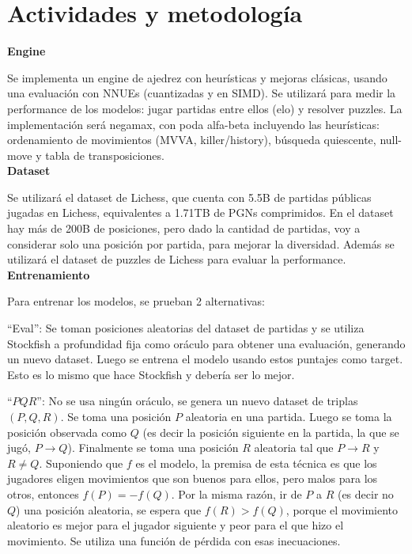\newpage
\section*{Actividades y metodología}

\textbf{Engine}

Se implementa un engine de ajedrez con heurísticas y mejoras clásicas, usando una evaluación con NNUEs (cuantizadas y en SIMD). Se utilizará para medir la performance de los modelos: jugar partidas entre ellos (elo) y resolver puzzles.
La implementación será negamax, con poda alfa-beta incluyendo las heurísticas: ordenamiento de movimientos (MVVA, killer/history), búsqueda quiescente, null-move y tabla de transposiciones. \\

\textbf{Dataset}

Se utilizará el dataset de Lichess, que cuenta con 5.5B de partidas públicas jugadas en Lichess, equivalentes a 1.71TB de PGNs comprimidos. En el dataset hay más de 200B de posiciones, pero dado la cantidad de partidas, voy a considerar solo una posición por partida, para mejorar la diversidad. Además se utilizará el dataset de puzzles de Lichess para evaluar la performance. \\

\textbf{Entrenamiento}

Para entrenar los modelos, se prueban 2 alternativas:

``Eval'': Se toman posiciones aleatorias del dataset de partidas y se utiliza Stockfish a profundidad fija como oráculo para obtener una evaluación, generando un nuevo dataset. Luego se entrena el modelo usando estos puntajes como target. Esto es lo mismo que hace Stockfish y debería ser lo mejor.


\cite{dlchess:2014}

``$PQR$'': No se usa ningún oráculo, se genera un nuevo dataset de triplas $(P,Q,R)$. Se toma una posición $P$ aleatoria en una partida. Luego se toma la posición observada como $Q$ (es decir la posición siguiente en la partida, la que se jugó, $P \rightarrow Q$). Finalmente se toma una posición $R$ aleatoria tal que $P \rightarrow R$ y $R \neq Q$. Suponiendo que $f$ es el modelo, la premisa de esta técnica es que los jugadores eligen movimientos que son buenos para ellos, pero malos para los otros, entonces $f(P)=-f(Q)$. Por la misma razón, ir de $P$ a $R$ (es decir no $Q$) una posición aleatoria, se espera que $f(R) > f(Q)$, porque el movimiento aleatorio es mejor para el jugador siguiente y peor para el que hizo el movimiento. Se utiliza una función de pérdida con esas inecuaciones.
